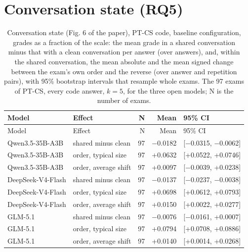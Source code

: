 \documentclass[10pt]{article}
\begin{document}
\section{Conversation state (RQ5)}
\begingroup\footnotesize
\begin{longtable}{llrrl}
\caption{Conversation state (Fig. 6 of the paper), PT-CS code, baseline configuration, grades as a fraction of the scale: the mean grade in a shared conversation minus that with a clean conversation per answer (over answers), and, within the shared conversation, the mean absolute and the mean signed change between the exam's own order and the reverse (over answer and repetition pairs), with 95\% bootstrap intervals that resample whole exams. The 97 exams of PT-CS, every code answer, $k=5$, for the three open models; N is the number of exams.}\\
\hline
Model & Effect & N & Mean & 95\% CI \\ \hline
\endfirsthead
\hline
Model & Effect & N & Mean & 95\% CI \\ \hline
\endhead
Qwen3.5-35B-A3B & shared minus clean & 97 & $-$0.0182 & [$-$0.0315, $-$0.0062] \\
Qwen3.5-35B-A3B & order, typical size & 97 & +0.0632 & [+0.0522, +0.0746] \\
Qwen3.5-35B-A3B & order, average shift & 97 & +0.0097 & [$-$0.0039, +0.0238] \\
DeepSeek-V4-Flash & shared minus clean & 97 & $-$0.0137 & [$-$0.0237, $-$0.0038] \\
DeepSeek-V4-Flash & order, typical size & 97 & +0.0698 & [+0.0612, +0.0793] \\
DeepSeek-V4-Flash & order, average shift & 97 & +0.0150 & [+0.0022, +0.0277] \\
GLM-5.1 & shared minus clean & 97 & $-$0.0076 & [$-$0.0161, +0.0007] \\
GLM-5.1 & order, typical size & 97 & +0.0794 & [+0.0708, +0.0886] \\
GLM-5.1 & order, average shift & 97 & +0.0140 & [+0.0014, +0.0268] \\
\hline
\end{longtable}
\endgroup
\end{document}
